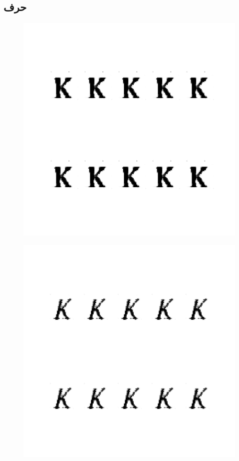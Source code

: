 \documentclass{article}
\begin{document}
\subsection{حرف }
\begin{figure}[H]
	\centerline{\includegraphics[width=\textwidth , height=\textheight ]{../results/CGAN_Adam/figs/letters/K/95.pdf}}
\end{figure}
\begin{figure}[H]
	\centerline{\includegraphics[width=\textwidth , height=\textheight ]{../results/CGAN_Adam/figs/letters/K/90.pdf}}
\end{figure}
\end{document}
